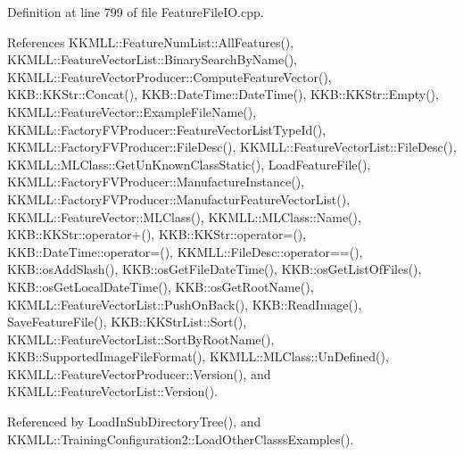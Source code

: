 Definition at line 799 of file Feature\+File\+I\+O.\+cpp.



References K\+K\+M\+L\+L\+::\+Feature\+Num\+List\+::\+All\+Features(), K\+K\+M\+L\+L\+::\+Feature\+Vector\+List\+::\+Binary\+Search\+By\+Name(), K\+K\+M\+L\+L\+::\+Feature\+Vector\+Producer\+::\+Compute\+Feature\+Vector(), K\+K\+B\+::\+K\+K\+Str\+::\+Concat(), K\+K\+B\+::\+Date\+Time\+::\+Date\+Time(), K\+K\+B\+::\+K\+K\+Str\+::\+Empty(), K\+K\+M\+L\+L\+::\+Feature\+Vector\+::\+Example\+File\+Name(), K\+K\+M\+L\+L\+::\+Factory\+F\+V\+Producer\+::\+Feature\+Vector\+List\+Type\+Id(), K\+K\+M\+L\+L\+::\+Factory\+F\+V\+Producer\+::\+File\+Desc(), K\+K\+M\+L\+L\+::\+Feature\+Vector\+List\+::\+File\+Desc(), K\+K\+M\+L\+L\+::\+M\+L\+Class\+::\+Get\+Un\+Known\+Class\+Static(), Load\+Feature\+File(), K\+K\+M\+L\+L\+::\+Factory\+F\+V\+Producer\+::\+Manufacture\+Instance(), K\+K\+M\+L\+L\+::\+Factory\+F\+V\+Producer\+::\+Manufactur\+Feature\+Vector\+List(), K\+K\+M\+L\+L\+::\+Feature\+Vector\+::\+M\+L\+Class(), K\+K\+M\+L\+L\+::\+M\+L\+Class\+::\+Name(), K\+K\+B\+::\+K\+K\+Str\+::operator+(), K\+K\+B\+::\+K\+K\+Str\+::operator=(), K\+K\+B\+::\+Date\+Time\+::operator=(), K\+K\+M\+L\+L\+::\+File\+Desc\+::operator==(), K\+K\+B\+::os\+Add\+Slash(), K\+K\+B\+::os\+Get\+File\+Date\+Time(), K\+K\+B\+::os\+Get\+List\+Of\+Files(), K\+K\+B\+::os\+Get\+Local\+Date\+Time(), K\+K\+B\+::os\+Get\+Root\+Name(), K\+K\+M\+L\+L\+::\+Feature\+Vector\+List\+::\+Push\+On\+Back(), K\+K\+B\+::\+Read\+Image(), Save\+Feature\+File(), K\+K\+B\+::\+K\+K\+Str\+List\+::\+Sort(), K\+K\+M\+L\+L\+::\+Feature\+Vector\+List\+::\+Sort\+By\+Root\+Name(), K\+K\+B\+::\+Supported\+Image\+File\+Format(), K\+K\+M\+L\+L\+::\+M\+L\+Class\+::\+Un\+Defined(), K\+K\+M\+L\+L\+::\+Feature\+Vector\+Producer\+::\+Version(), and K\+K\+M\+L\+L\+::\+Feature\+Vector\+List\+::\+Version().



Referenced by Load\+In\+Sub\+Directory\+Tree(), and K\+K\+M\+L\+L\+::\+Training\+Configuration2\+::\+Load\+Other\+Classs\+Examples().


